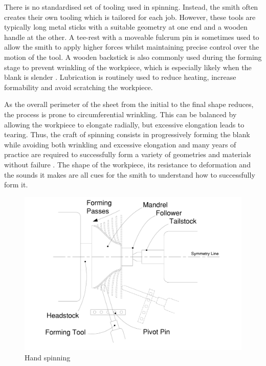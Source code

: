There is no standardised set of tooling used in spinning. Instead, the smith often creates their own tooling which is tailored for each job. However, these tools are typically long metal sticks with a suitable geometry at one end and a wooden handle at the other. A tee-rest with a moveable fulcrum pin is sometimes used to allow the smith to apply higher forces whilst maintaining precise control over the motion of the tool. A wooden backstick is also commonly used during the forming stage to prevent wrinkling of the workpiece, which is especially likely when the blank is slender \citep{Jawale2019AnSpinning}. Lubrication is routinely used to reduce heating, increase formability and avoid scratching the workpiece.

As the overall perimeter of the sheet from the initial to the final shape reduces, the process is prone to circumferential wrinkling. This can be balanced by allowing the workpiece to elongate radially, but excessive elongation leads to tearing. Thus, the craft of spinning consists in progressively forming the blank while avoiding both wrinkling and excessive elongation and many years of practice are required to successfully form a variety of geometries and materials without failure \citep{Holtzappfel1852TurningManipulation,Tuells1912MetalUsed}. The shape of the workpiece, its resistance to deformation and the sounds it makes are all cues for the smith to understand how to successfully form it.

\begin{figure}[h]
    \centering
    \includegraphics[width=0.6\linewidth]{Images/Spinning.pdf}
    \caption{Hand spinning}
    \label{fig:SpinningTechDrawing}
\end{figure}



